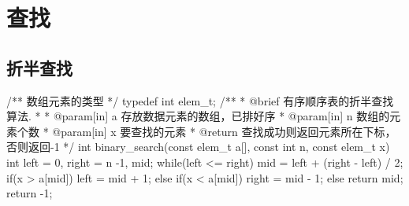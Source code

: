\chapter{查找}

\section{折半查找} %

\begin{Codex}[label=binary_search.c]
/** 数组元素的类型 */
typedef int elem_t;
/**
  * @brief 有序顺序表的折半查找算法.
  *
  * @param[in] a 存放数据元素的数组，已排好序
  * @param[in] n 数组的元素个数
  * @param[in] x 要查找的元素
  * @return 查找成功则返回元素所在下标，否则返回-1
  */
int binary_search(const elem_t a[], const int n, const elem_t x)
{
    int left = 0, right = n -1, mid;
    while(left <= right) {
        mid = left + (right - left) / 2;
        if(x > a[mid]) {
            left = mid + 1;
        } else if(x < a[mid]) {
            right = mid - 1;
        } else {
            return mid;
        }
    }
    return -1;
}
\end{Codex}

